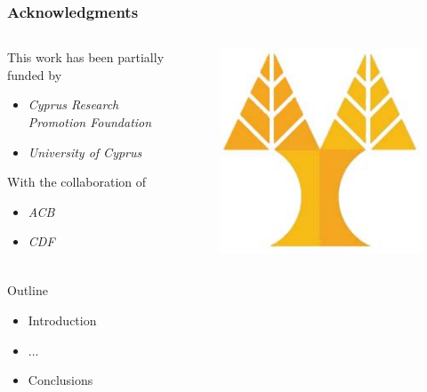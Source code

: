 \documentclass[hyperref={pdfpagelabels=false}]{beamer}
\begin{document}
\begin{frame} 
\frametitle{Acknowledgments}
	\begin{columns}
		\begin{column}{7cm}
		This work has been partially funded by
			\begin{itemize}
			\item \textit{Cyprus Research Promotion Foundation}
			\item \textit{University of Cyprus}
			\end{itemize}
		With the collaboration of
			\begin{itemize}
			\item \textit{ACB}
			\item \textit{CDF}
			\end{itemize}		
		\end{column}	
		\begin{column}{3cm}

			\begin{figure}
			\includegraphics[totalheight=1.5cm]{./figures/ucylogo.pdf} 
			\end{figure}
		\end{column}
	\end{columns}
\end{frame}



\begin{frame}{Outline}
	\begin{itemize}
	\item Introduction
	\item ...
	\item Conclusions
\end{itemize}	
\end{frame}
\end{document}
